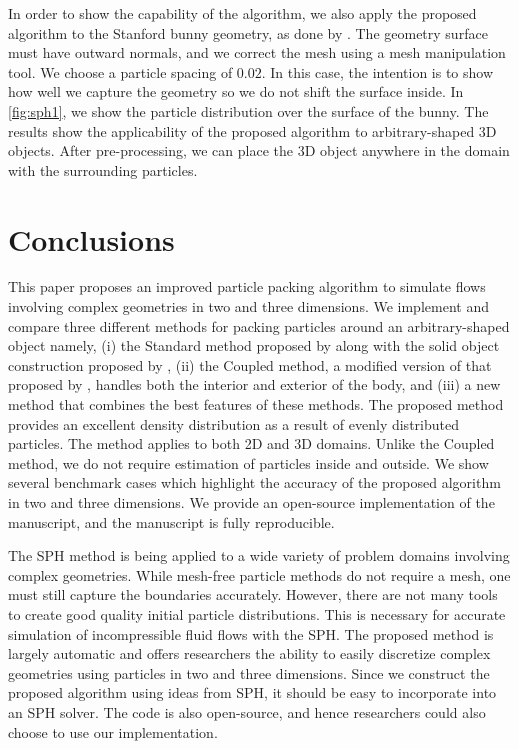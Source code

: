 \documentclass[preprint,12pt]{elsarticle}
\begin{document}
In order to show the capability of the algorithm, we also apply the proposed
algorithm to the Stanford bunny geometry, as done by \citet{jiang2015blue}.
The geometry surface must have outward normals, and we correct the
mesh using a mesh manipulation tool. We choose a particle spacing of $0.02$.
In this case, the intention is to show how well we capture the geometry so
we do not shift the surface inside. In \cref{fig:sph1}, we show the particle
distribution over the surface of the bunny. The results show the
applicability of the proposed algorithm to arbitrary-shaped 3D objects. After
pre-processing, we can place the 3D object anywhere in the domain with the
surrounding particles.


\section{Conclusions}
\label{sec:conclusions}

This paper proposes an improved particle packing algorithm to simulate flows
involving complex geometries in two and three dimensions. We implement and
compare three different methods for packing particles around an
arbitrary-shaped object namely, (i) the Standard method proposed by
\citet{colagrossi2012particle} along with the solid object construction
proposed by \citet{marrone-deltasph:cmame:2011}, (ii) the Coupled method, a
modified version of that proposed by \citet{jiang2015blue}, handles both the
interior and exterior of the body, and (iii) a new method that combines the
best features of these methods. The proposed method provides an excellent
density distribution as a result of evenly distributed particles. The method
applies to both 2D and 3D domains. Unlike the Coupled method, we do not
require estimation of particles inside and outside. We show several benchmark
cases which highlight the accuracy of the proposed algorithm in two and three
dimensions. We provide an open-source implementation of the manuscript, and
the manuscript is fully reproducible.

The SPH method is being applied to a wide variety of problem domains involving
complex geometries. While mesh-free particle methods do not require a mesh,
one must still capture the boundaries accurately. However, there are not many
tools to create good quality initial particle distributions. This is necessary
for accurate simulation of incompressible fluid flows with the SPH. The
proposed method is largely automatic and offers researchers the ability to
easily discretize complex geometries using particles in two and three
dimensions. Since we construct the proposed algorithm using ideas from SPH, it
should be easy to incorporate into an SPH solver. The code is also
open-source, and hence researchers could also choose to use our
implementation.
\end{document}
